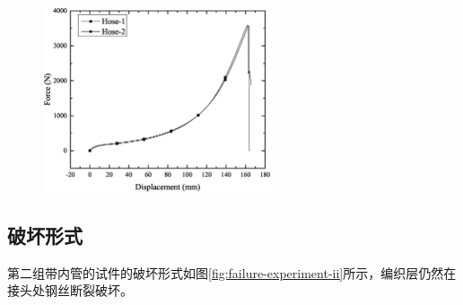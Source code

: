 \begin{figure}[!htb]
	\centering
	\includegraphics[width=0.6\textwidth]{figure/experiment/E2/Graph01}
	\label{fig:experiment-2}
\end{figure}


\subsection{破坏形式}



第二组带内管的试件的破坏形式如图\ref{fig:failure-experiment-ii}所示，编织层仍然在接头处钢丝断裂破坏。


